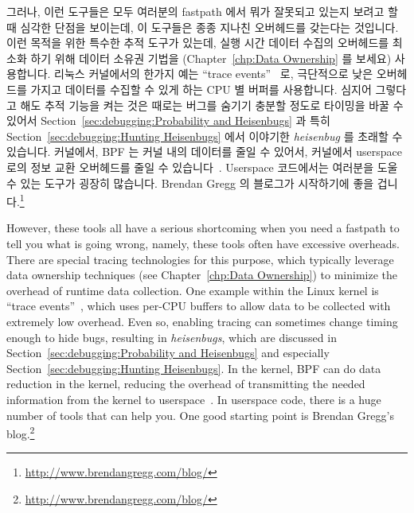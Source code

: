 \fi

그러나, 이런 도구들은 모두 여러분의 fastpath 에서 뭐가 잘못되고 있는지 보려고
할 때 심각한 단점을 보이는데, 이 도구들은 종종 지나친 오버헤드를 갖는다는
것입니다.
이런 목적을 위한 특수한 추적 도구가 있는데, 실행 시간 데이터 수집의 오버헤드를
최소화 하기 위해 데이터 소유권 기법을
(Chapter~\ref{chp:Data Ownership} 를 보세요)
사용합니다.
리눅스 커널에서의 한가지 예는 ``trace
events''~\cite{StevenRostedt2010perfTraceEventP1,StevenRostedt2010perfTraceEventP2,StevenRostedt2010perfTraceEventP3,StevenRostedt2010perfHP+DeathlyMacros}
로, 극단적으로 낮은 오버헤드를 가지고 데이터를 수집할 수 있게 하는 CPU 별
버퍼를 사용합니다.
심지어 그렇다고 해도 추적 기능을 켜는 것은 때로는 버그를 숨기기 충분할 정도로
타이밍을 바꿀 수 있어서
Section~\ref{sec:debugging:Probability and Heisenbugs} 과
특히 Section~\ref{sec:debugging:Hunting Heisenbugs} 에서 이야기한
\emph{heisenbug} 를 초래할 수 있습니다.
커널에서, BPF 는 커널 내의 데이터를 줄일 수 있어서, 커널에서 userspace 로의
정보 교환 오버헤드를 줄일 수 있습니다~\cite{BrendanGregg2019BPFperftools}.
Userspace 코드에서는 여러분을 도울 수 있는 도구가 굉장히 많습니다.
Brendan Gregg 의 블로그가 시작하기에 좋을 겁니다.\footnote{
	\url{http://www.brendangregg.com/blog/}}

\iffalse

However, these tools all have a serious shortcoming when you need a
fastpath to tell you what is going wrong, namely, these tools often have
excessive overheads.
There are special tracing technologies for this purpose, which typically
leverage data ownership techniques
(see Chapter~\ref{chp:Data Ownership})
to minimize the overhead of runtime data collection.
One example within the Linux kernel is
``trace events''~\cite{StevenRostedt2010perfTraceEventP1,StevenRostedt2010perfTraceEventP2,StevenRostedt2010perfTraceEventP3,StevenRostedt2010perfHP+DeathlyMacros},
which uses per-CPU buffers to allow data to be collected with
extremely low overhead.
Even so, enabling tracing can sometimes change timing enough to
hide bugs, resulting in \emph{heisenbugs}, which are discussed in
Section~\ref{sec:debugging:Probability and Heisenbugs}
and especially Section~\ref{sec:debugging:Hunting Heisenbugs}.
In the kernel, BPF can do data reduction in the kernel, reducing
the overhead of transmitting the needed information from the kernel
to userspace~\cite{BrendanGregg2019BPFperftools}.
In userspace code, there is a huge number of tools that can help you.
One good starting point is Brendan Gregg's blog.\footnote{
	\url{http://www.brendangregg.com/blog/}}

